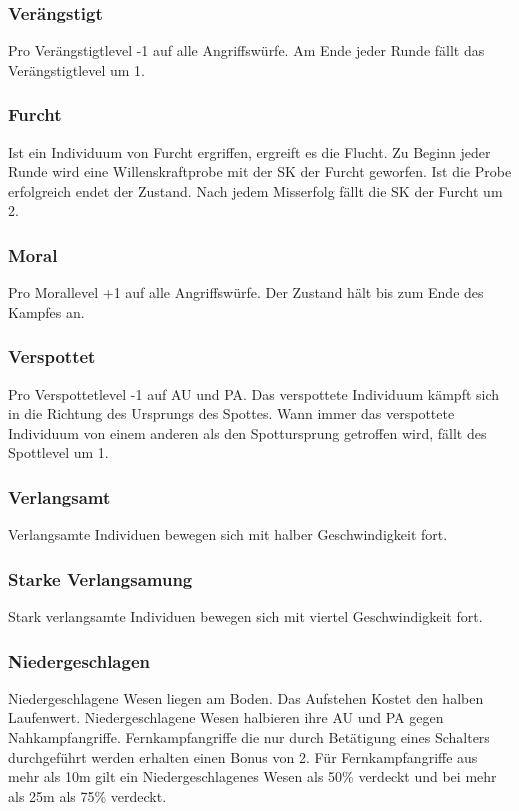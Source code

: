 \documentclass[../../Heldenanleitung2]{subfiles}
\begin{document}
\subsubsection{Verängstigt}
Pro Verängstigtlevel -1 auf alle Angriffswürfe. Am Ende jeder Runde fällt das Verängstigtlevel um 1.

\subsubsection{Furcht}
Ist ein Individuum von Furcht ergriffen, ergreift es die Flucht. Zu Beginn jeder Runde wird eine Willenskraftprobe mit der SK der Furcht geworfen. Ist die Probe erfolgreich endet der Zustand. Nach jedem Misserfolg fällt die SK der Furcht um 2.

\subsubsection{Moral}
Pro Morallevel +1 auf alle Angriffswürfe. Der Zustand hält bis zum Ende des Kampfes an.

\subsubsection{Verspottet}
Pro Verspottetlevel -1 auf AU und PA. Das verspottete Individuum kämpft sich in die Richtung des Ursprungs des Spottes. Wann immer das verspottete Individuum von einem anderen als den Spottursprung getroffen wird, fällt des Spottlevel um 1.

\subsubsection{Verlangsamt}
Verlangsamte Individuen bewegen sich mit halber Geschwindigkeit fort.

\subsubsection{Starke Verlangsamung}
Stark verlangsamte Individuen bewegen sich mit viertel Geschwindigkeit fort.

\subsubsection{Niedergeschlagen}
Niedergeschlagene Wesen liegen am Boden. Das Aufstehen Kostet den halben Laufenwert. Niedergeschlagene Wesen halbieren ihre AU und PA gegen Nahkampfangriffe. Fernkampfangriffe die nur durch Betätigung eines Schalters durchgeführt werden erhalten einen Bonus von 2. Für Fernkampfangriffe aus mehr als 10m gilt ein Niedergeschlagenes Wesen als 50\% verdeckt und bei mehr als 25m als 75\% verdeckt.
\end{document}
